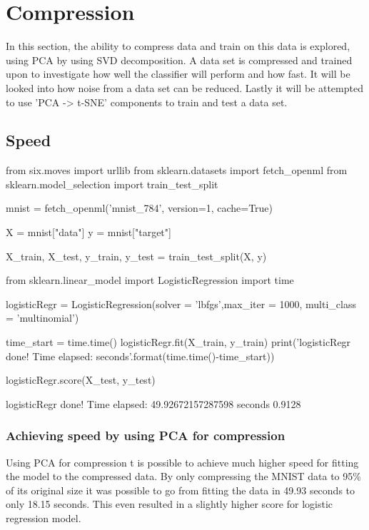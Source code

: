 \documentclass{article}
\begin{document}
\section{Compression}
In this section, the ability to compress data and train on this data is explored, using PCA by using SVD decomposition. A data set is compressed and trained upon to investigate how well the classifier will perform and how fast. It will be looked into how noise from a data set can be reduced. Lastly it will be attempted to use 'PCA -> t-SNE' components to train and test a data set. 

\subsection{Speed}

\begin{pyminted}
from six.moves import urllib
from sklearn.datasets import fetch_openml
from sklearn.model_selection import train_test_split

mnist = fetch_openml('mnist_784', version=1, cache=True)

X = mnist["data"]
y = mnist["target"]

X_train, X_test, y_train, y_test = train_test_split(X, y)
\end{pyminted}

\begin{pyminted}
from sklearn.linear_model import LogisticRegression
import time

logisticRegr = LogisticRegression(solver = 'lbfgs',max_iter = 1000, multi_class = 'multinomial')

time_start = time.time()
logisticRegr.fit(X_train, y_train)
print('logisticRegr done! Time elapsed: {} seconds'.format(time.time()-time_start))

logisticRegr.score(X_test, y_test)
\end{pyminted}
\begin{pyconsole}
logisticRegr done! Time elapsed: 49.92672157287598 seconds
0.9128
\end{pyconsole}

\subsubsection{Achieving speed by using PCA for compression}
Using PCA for compression t is possible to achieve much higher speed for fitting the model to the compressed data. By only compressing the MNIST data to 95\% of its original size it was possible to go from fitting the data in 49.93 seconds to only 18.15 seconds. This even resulted in a slightly higher score for logistic regression model.
\end{document}
